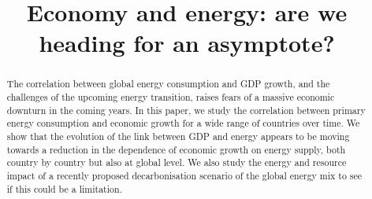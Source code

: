 \documentclass[conference]{IEEEtran}
\begin{document}
\baselineskip=13pt
\title{Economy and energy: are we heading for an asymptote? }

\author{

}

\maketitle

\begin{abstract}
\baselineskip=13pt
The correlation between global energy consumption and GDP growth, and the challenges of the upcoming energy transition, raises fears of a massive economic downturn in the coming years. In this paper, we study the correlation between primary energy consumption and economic growth for a wide range of countries over time. We show that the evolution of the link between GDP and energy appears to be moving towards a reduction in the dependence of economic growth on energy supply, both country by country but also at global level. We also study the energy and resource impact of a recently proposed decarbonisation scenario of the global energy mix to see if this could be a limitation. 

\end{abstract}
\end{document}
